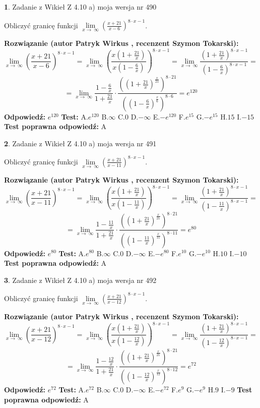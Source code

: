 \documentclass[12pt, a4paper]{article}
\theoremstyle{definition} %
\newtheorem{zad}{}
\newcommand{\zadStart}[1]{\begin{zad}#1\newline}
\newcommand{\zadStop}{\end{zad}}
\newcommand{\rozwStart}[2]{\noindent \textbf{Rozwiązanie (autor #1 , recenzent #2): }\newline}
\newcommand{\rozwStop}{\newline}
\newcommand{\odpStart}{\noindent \textbf{Odpowiedź:}\newline}
\newcommand{\odpStop}{\newline}
\newcommand{\testStart}{\noindent \textbf{Test:}\newline}
\newcommand{\testStop}{\newline}
\newcommand{\kluczStart}{\noindent \textbf{Test poprawna odpowiedź:}\newline}
\newcommand{\kluczStop}{\newline}
\begin{document}
\zadStart{Zadanie z Wikieł Z 4.10 a) moja wersja nr 490}

Obliczyć granicę funkcji  $\lim\limits_{x\to\ \infty}(\frac{x+21}{x-6})^{8\cdot x-1}$.
\zadStop
\rozwStart{Patryk Wirkus}{Szymon Tokarski}
$$\lim\limits_{x\to\ \infty}(\frac{x+21}{x-6})^{8\cdot x-1} = \lim\limits_{x\to\ \infty}(\frac{x(1+\frac{21}{x})}{x(1-\frac{6}{x})})^{8\cdot x-1}=\lim\limits_{x\to\ \infty}\frac{(1+\frac{21}{x})^{8\cdot x-1}}{(1-\frac{6}{x})^{8\cdot x-1}}=$$
$$=\lim\limits_{x\to\ \infty}\frac{1-\frac{6}{x}}{1+\frac{21}{x}}\cdot\frac{((1+\frac{21}{x})^{\frac{x}{21}})^{8\cdot21}}{((1-\frac{6}{x})^{\frac{x}{6}})^{8\cdot6}}=e^{120}$$
\rozwStop
\odpStart
$e^{120}$
\odpStop
\testStart
A.$e^{120}$ B.$\infty$ C.$0$ D.$-\infty$ E.$-e^{120}$
F.$e^{15}$ G.$-e^{15}$
H.$15$
I.$-15$
\testStop
\kluczStart
A
\kluczStop



\zadStart{Zadanie z Wikieł Z 4.10 a) moja wersja nr 491}

Obliczyć granicę funkcji  $\lim\limits_{x\to\ \infty}(\frac{x+21}{x-11})^{8\cdot x-1}$.
\zadStop
\rozwStart{Patryk Wirkus}{Szymon Tokarski}
$$\lim\limits_{x\to\ \infty}(\frac{x+21}{x-11})^{8\cdot x-1} = \lim\limits_{x\to\ \infty}(\frac{x(1+\frac{21}{x})}{x(1-\frac{11}{x})})^{8\cdot x-1}=\lim\limits_{x\to\ \infty}\frac{(1+\frac{21}{x})^{8\cdot x-1}}{(1-\frac{11}{x})^{8\cdot x-1}}=$$
$$=\lim\limits_{x\to\ \infty}\frac{1-\frac{11}{x}}{1+\frac{21}{x}}\cdot\frac{((1+\frac{21}{x})^{\frac{x}{21}})^{8\cdot21}}{((1-\frac{11}{x})^{\frac{x}{11}})^{8\cdot11}}=e^{80}$$
\rozwStop
\odpStart
$e^{80}$
\odpStop
\testStart
A.$e^{80}$ B.$\infty$ C.$0$ D.$-\infty$ E.$-e^{80}$
F.$e^{10}$ G.$-e^{10}$
H.$10$
I.$-10$
\testStop
\kluczStart
A
\kluczStop



\zadStart{Zadanie z Wikieł Z 4.10 a) moja wersja nr 492}

Obliczyć granicę funkcji  $\lim\limits_{x\to\ \infty}(\frac{x+21}{x-12})^{8\cdot x-1}$.
\zadStop
\rozwStart{Patryk Wirkus}{Szymon Tokarski}
$$\lim\limits_{x\to\ \infty}(\frac{x+21}{x-12})^{8\cdot x-1} = \lim\limits_{x\to\ \infty}(\frac{x(1+\frac{21}{x})}{x(1-\frac{12}{x})})^{8\cdot x-1}=\lim\limits_{x\to\ \infty}\frac{(1+\frac{21}{x})^{8\cdot x-1}}{(1-\frac{12}{x})^{8\cdot x-1}}=$$
$$=\lim\limits_{x\to\ \infty}\frac{1-\frac{12}{x}}{1+\frac{21}{x}}\cdot\frac{((1+\frac{21}{x})^{\frac{x}{21}})^{8\cdot21}}{((1-\frac{12}{x})^{\frac{x}{12}})^{8\cdot12}}=e^{72}$$
\rozwStop
\odpStart
$e^{72}$
\odpStop
\testStart
A.$e^{72}$ B.$\infty$ C.$0$ D.$-\infty$ E.$-e^{72}$
F.$e^{9}$ G.$-e^{9}$
H.$9$
I.$-9$
\testStop
\kluczStart
A
\kluczStop
\end{document}
